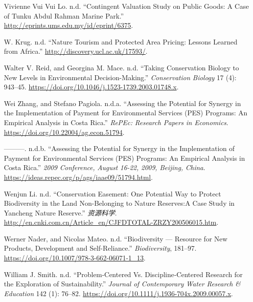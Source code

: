 \begin{CSLReferences}{1}{0}
Vivienne Vui Vui Lo. n.d. {``Contingent Valuation Study on Public Goods:
A Case of Tunku Abdul Rahman Marine Park.''}
\url{http://eprints.ums.edu.my/id/eprint/6375}.

W. Krug. n.d. {``Nature Tourism and Protected Area Pricing: Lessons
Learned from Africa.''} \url{http://discovery.ucl.ac.uk/17593/}.

Walter V. Reid, and Georgina M. Mace. n.d. {``Taking Conservation
Biology to New Levels in Environmental Decision-Making.''}
\emph{Conservation Biology} 17 (4): 943--45.
\url{https://doi.org/10.1046/j.1523-1739.2003.01748.x}.

Wei Zhang, and Stefano Pagiola. n.d.a. {``Assessing the Potential for
Synergy in the Implementation of Payment for Environmental Services
(PES) Programs: An Empirical Analysis in Costa Rica.''} \emph{RePEc:
Research Papers in Economics}.
\url{https://doi.org/10.22004/ag.econ.51794}.

---------. n.d.b. {``Assessing the Potential for Synergy in the
Implementation of Payment for Environmental Services (PES) Programs: An
Empirical Analysis in Costa Rica.''} \emph{2009 Conference, August
16-22, 2009, Beijing, China}.
\url{https://ideas.repec.org/p/ags/iaae09/51794.html}.

Wenjun Li. n.d. {``Conservation Easement: One Potential Way to Protect
Biodiversity in the Land Non-Belonging to Nature Reserves:A Case Study
in Yancheng Nature Reserve.''} \emph{资源科学}.
\url{http://en.cnki.com.cn/Article_en/CJFDTOTAL-ZRZY200506015.htm}.

Werner Nader, and Nicolas Mateo. n.d. {``Biodiversity --- Resource for
New Products, Development and Self-Reliance.''} \emph{Biodiversity},
181--97. \url{https://doi.org/10.1007/978-3-662-06071-1_13}.

William J. Smith. n.d. {``Problem‐Centered Vs. Discipline‐Centered
Research for the Exploration of Sustainability.''} \emph{Journal of
Contemporary Water Research \& Education} 142 (1): 76--82.
\url{https://doi.org/10.1111/j.1936-704x.2009.00057.x}.


\end{CSLReferences}
